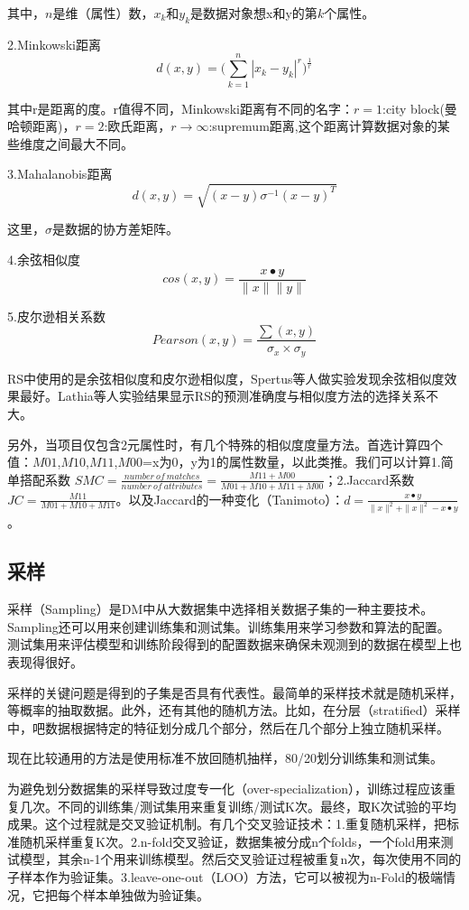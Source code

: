 \documentclass{article}
\begin{document}
 其中，$ n $是维（属性）数，$ x_k $和$ y_k $是数据对象想x和y的第$ k $个属性。

 2.Minkowski距离
 $$ d(x,y)=({\mathop{\sum}_{k=1}^n|x_k-y_k|^r)^\frac{1}{r}} $$

 其中r是距离的度。r值得不同，Minkowski距离有不同的名字：$r=1$:city block(曼哈顿距离)，$r=2$:欧氏距离，$r\rightarrow\infty$:supremum距离,这个距离计算数据对象的某些维度之间最大不同。

 3.Mahalanobis距离
 $$ d(x,y)=\sqrt{(x-y)\sigma^{-1}(x-y)^T} $$

 这里，$\sigma$是数据的协方差矩阵。

 4.余弦相似度
 $$ cos(x,y)=\frac{x\bullet y}{\|x\|\|y\|} $$

 5.皮尔逊相关系数
 $$ Pearson(x,y)=\frac{\sum(x,y)}{\sigma_x\times\sigma_y} $$

 RS中使用的是余弦相似度和皮尔逊相似度，Spertus等人做实验发现余弦相似度效果最好。Lathia等人实验结果显示RS的预测准确度与相似度方法的选择关系不大。

 另外，当项目仅包含2元属性时，有几个特殊的相似度度量方法。首选计算四个值：$M01$,$M10$,$M11$,$M00$=x为0，y为1的属性数量，以此类推。我们可以计算1.简单搭配系数 $ SMC=\frac{number\ of\ matches}{number\ of\ attributes}=\frac{M11+M00}{M01+M10+M11+M00} $；2.Jaccard系数$JC=\frac{M11}{M01+M10+M11}$。以及Jaccard的一种变化（Tanimoto）：$ d=\frac{x\bullet y}{\|x\|^2+\|x\|^2-x\bullet y} $。

 \subsection{采样}
 采样（Sampling）是DM中从大数据集中选择相关数据子集的一种主要技术。Sampling还可以用来创建训练集和测试集。训练集用来学习参数和算法的配置。测试集用来评估模型和训练阶段得到的配置数据来确保未观测到的数据在模型上也表现得很好。

 采样的关键问题是得到的子集是否具有代表性。最简单的采样技术就是随机采样，等概率的抽取数据。此外，还有其他的随机方法。比如，在分层（stratified）采样中，吧数据根据特定的特征划分成几个部分，然后在几个部分上独立随机采样。

 现在比较通用的方法是使用标准不放回随机抽样，80/20划分训练集和测试集。

 为避免划分数据集的采样导致过度专一化（over-specialization），训练过程应该重复几次。不同的训练集/测试集用来重复训练/测试K次。最终，取K次试验的平均成果。这个过程就是交叉验证机制。有几个交叉验证技术：1.重复随机采样，把标准随机采样重复K次。2.n-fold交叉验证，数据集被分成n个folds，一个fold用来测试模型，其余n-1个用来训练模型。然后交叉验证过程被重复n次，每次使用不同的子样本作为验证集。3.leave-one-out（LOO）方法，它可以被视为n-Fold的极端情况，它把每个样本单独做为验证集。
\end{document}
